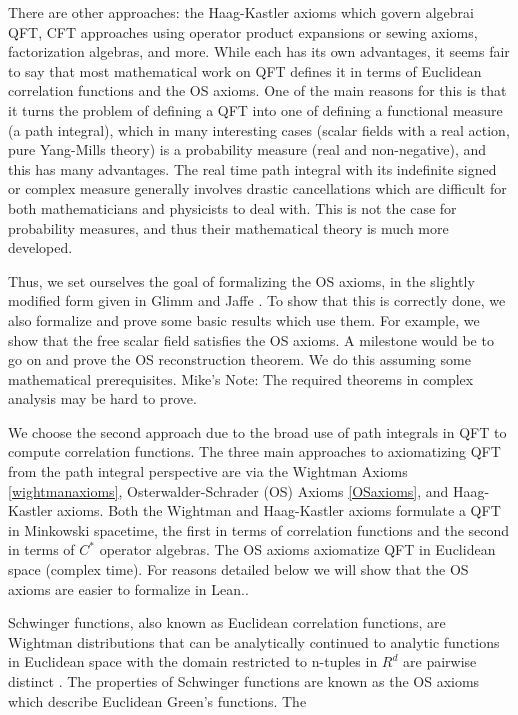 \documentclass{article}
\newcommand\MRD[1]{{\color{red} Mike's Note: #1}}
\begin{document}
There are other approaches: the Haag-Kastler axioms which govern algebrai QFT, CFT approaches using operator product expansions or sewing axioms,
factorization algebras, and more.  While each has its own advantages, it seems fair to say that most mathematical work on QFT defines it in terms of
Euclidean correlation functions and the OS axioms.  One of the main reasons for this is that it turns the problem of defining a QFT into one of 
defining a functional measure (a path integral), which in many interesting cases (scalar fields with a real action, pure Yang-Mills theory) is a
probability measure (real and non-negative), and this has many advantages.  The real time path integral with its
indefinite signed or complex measure generally involves drastic cancellations which are difficult for both mathematicians and physicists to deal with.
This is not the case for probability measures, and thus their mathematical theory is much more developed.

Thus, we set ourselves the goal of formalizing the OS axioms, in the slightly modified form given in Glimm and Jaffe \cite{GJ1987Axioms}.
To show that this is correctly done, we also formalize and prove some basic results which use them.
For example, we show that the free scalar field satisfies the OS axioms.  A milestone would be to go on and prove the OS reconstruction theorem.
We do this assuming some mathematical prerequisites. \MRD{The required theorems in complex analysis may be hard to prove.}


\iffalse
We choose the second approach due to the broad use of path integrals in QFT to compute correlation functions. 
The three main approaches to axiomatizing QFT from the path integral perspective are via the Wightman Axioms \ref{wightmanaxioms}, Osterwalder-Schrader (OS) Axioms \ref{OSaxioms}, and Haag-Kastler axioms. Both the Wightman and Haag-Kastler axioms formulate a QFT in Minkowski spacetime, the first in terms of correlation functions and the second in terms of $C^*$ operator algebras.
The OS axioms axiomatize QFT in Euclidean space (complex time). For reasons detailed below we will show that the OS axioms are easier to formalize in Lean.. 

Schwinger functions, also known as Euclidean correlation functions, are Wightman distributions that can be analytically continued to analytic functions in Euclidean space with the domain restricted to n-tuples in $R^d$ are pairwise distinct \cite{1 }. The properties of Schwinger functions are known as the OS axioms which describe Euclidean Green's functions. The 
\end{document}
